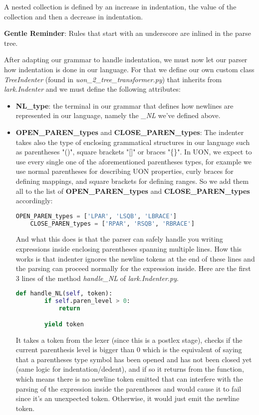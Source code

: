 \documentclass[12pt]{article}
\begin{document}
A nested collection is defined by an increase in indentation, the value of the collection and then a decrease in indentation.

\textbf{Gentle Reminder}: Rules that start with an underscore are inlined in the parse tree.

After adapting our grammar to handle indentation, we must now let our parser how indentation is done in our language. For that we define our own custom class \emph{TreeIndenter} (found in \emph{uon\_2\_tree\_transformer.py}) that inherits from \emph{lark.Indenter} and we must define the following attributes:
\begin{itemize}
    \item \textbf{NL\_type}: the terminal in our grammar that defines how newlines are represented in our language, namely the \emph{\_NL} we've defined above.
    \item \textbf{OPEN\_PAREN\_types} and \textbf{CLOSE\_PAREN\_types}: The indenter takes also the type of enclosing grammatical structures in our language such as parentheses "()", square brackets "[]" or braces "\{\}". In UON, we expect to use every single one of the aforementioned parentheses types, for example we use normal parentheses for describing UON properties, curly braces for defining mappings, and square brackets for defining ranges. So we add them all to the list of \textbf{OPEN\_PAREN\_types} and \textbf{CLOSE\_PAREN\_types} accordingly:
    
    \begin{lstlisting}[language=python]
    OPEN_PAREN_types = ['LPAR', 'LSQB', 'LBRACE']
    CLOSE_PAREN_types = ['RPAR', 'RSQB', 'RBRACE']
    \end{lstlisting}
    
    And what this does is that the parser can safely handle you writing expressions inside enclosing parentheses spanning multiple lines. How this works is that indenter ignores the newline tokens at the end of these lines and the parsing can proceed normally for the expression inside. Here are the first 3 lines of the method \emph{handle\_NL} of \emph{lark.Indenter.py}. 
    
    \begin{lstlisting}[language = python]
    def handle_NL(self, token):
        if self.paren_level > 0:
            return

        yield token
    \end{lstlisting}
    
    It takes a token from the lexer (since this is a postlex stage), checks if the current parenthesis level is bigger than 0 which is the equivalent of saying that a parentheses type symbol has been opened and has not been closed yet (same logic for indentation/dedent), and if so it returns from the function, which means there is no newline token emitted that can interfere with the parsing of the expression inside the parentheses and would cause it to fail since it’s an unexpected token. Otherwise, it would just emit the newline token.


\end{itemize}
\end{document}
